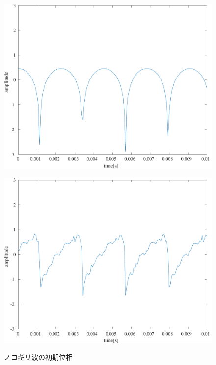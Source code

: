 \begin{figure}[H]
\begin{minipage}{.24\textwidth}
    \end{minipage}
    \begin{minipage}{.24\textwidth}
        \centering
        \label{fig:実験結果ノコギリ波_p2PI}
        \includegraphics[keepaspectratio,width=\textwidth]{../../Figures/03_23.pdf}
    \end{minipage}
    \begin{minipage}{.24\textwidth}
        \centering
        \label{fig:実験結果ノコギリ波_rand}
        \includegraphics[keepaspectratio,width=\textwidth]{../../Figures/03_24.pdf}
    \end{minipage}
    \caption{ノコギリ波の初期位相}
    \label{fig:ノコギリ波の初期位相}
\end{figure}
